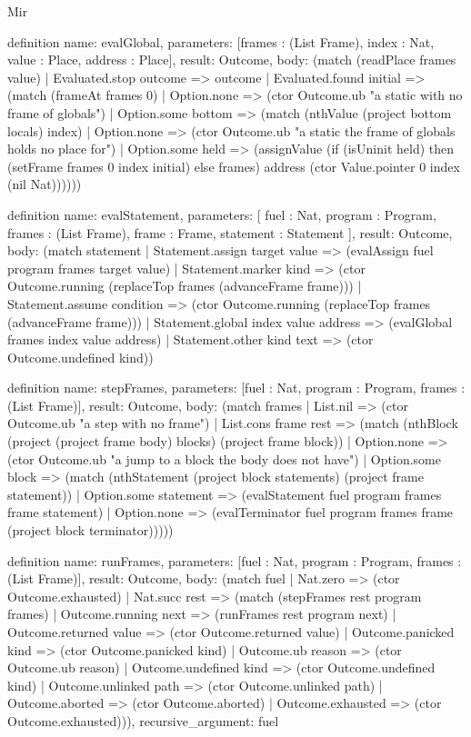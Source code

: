 \begin{lexlean}{Mir}
\begin{semanticmodule}
definition{
  name: evalGlobal,
  parameters: [frames : (List Frame), index : Nat, value : Place, address : Place],
  result: Outcome,
  body: (match (readPlace frames value)
    | Evaluated.stop outcome => outcome
    | Evaluated.found initial => (match (frameAt frames 0)
      | Option.none => (ctor Outcome.ub "a static with no frame of globals")
      | Option.some bottom => (match (nthValue (project bottom locals) index)
        | Option.none => (ctor Outcome.ub "a static the frame of globals holds no place for")
        | Option.some held => (assignValue (if (isUninit held) then (setFrame frames 0 index initial) else frames) address (ctor Value.pointer 0 index (nil Nat))))))
}

definition{
  name: evalStatement,
  parameters: [
    fuel : Nat,
    program : Program,
    frames : (List Frame),
    frame : Frame,
    statement : Statement
  ],
  result: Outcome,
  body: (match statement
    | Statement.assign target value => (evalAssign fuel program frames target value)
    | Statement.marker kind => (ctor Outcome.running (replaceTop frames (advanceFrame frame)))
    | Statement.assume condition => (ctor Outcome.running (replaceTop frames (advanceFrame frame)))
    | Statement.global index value address => (evalGlobal frames index value address)
    | Statement.other kind text => (ctor Outcome.undefined kind))
}

definition{
  name: stepFrames,
  parameters: [fuel : Nat, program : Program, frames : (List Frame)],
  result: Outcome,
  body: (match frames
    | List.nil => (ctor Outcome.ub "a step with no frame")
    | List.cons frame rest => (match (nthBlock (project (project frame body) blocks) (project frame block))
      | Option.none => (ctor Outcome.ub "a jump to a block the body does not have")
      | Option.some block => (match (nthStatement (project block statements) (project frame statement))
        | Option.some statement => (evalStatement fuel program frames frame statement)
        | Option.none => (evalTerminator fuel program frames frame (project block terminator)))))
}

definition{
  name: runFrames,
  parameters: [fuel : Nat, program : Program, frames : (List Frame)],
  result: Outcome,
  body: (match fuel
    | Nat.zero => (ctor Outcome.exhausted)
    | Nat.succ rest => (match (stepFrames rest program frames)
      | Outcome.running next => (runFrames rest program next)
      | Outcome.returned value => (ctor Outcome.returned value)
      | Outcome.panicked kind => (ctor Outcome.panicked kind)
      | Outcome.ub reason => (ctor Outcome.ub reason)
      | Outcome.undefined kind => (ctor Outcome.undefined kind)
      | Outcome.unlinked path => (ctor Outcome.unlinked path)
      | Outcome.aborted => (ctor Outcome.aborted)
      | Outcome.exhausted => (ctor Outcome.exhausted))),
  recursive_argument: fuel
}


\end{semanticmodule}
\end{lexlean}
